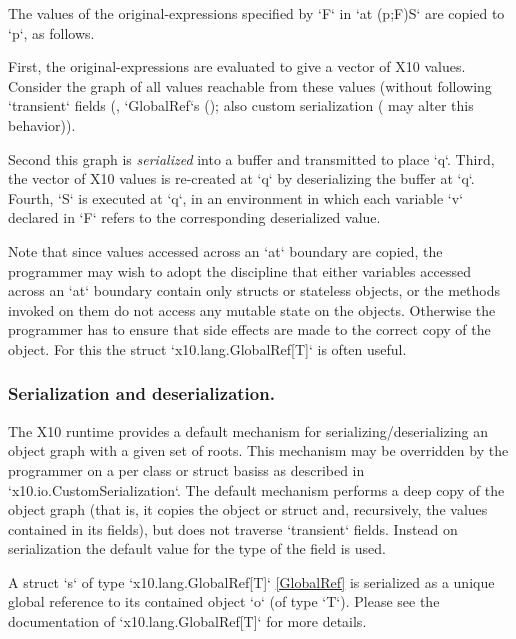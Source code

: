 The values of the original-expressions  specified by \xcd`F` in 
\xcd`at (p;F)S` are copied to \xcd`p`, as follows.

First, the original-expressions are evaluated to give a vector of X10 values.
Consider the graph of all values reachable from these values (without
following 
\xcd`transient` fields 
(, \xcd`GlobalRef`s (); also custom
serialization ( may alter this behavior)). 

Second this graph is {\em
serialized} into a buffer and transmitted to place \xcd`q`.  Third,
the vector of X10 values is 
re-created at \xcd`q` 
by deserializing the buffer at
\xcd`q`. Fourth, \xcd`S` is executed at \xcd`q`, in an environment in
which each variable \xcd`v` declared in \xcd`F` 
refers to the corresponding deserialized value.  

Note that since values accessed across an \xcd`at` boundary are
copied, the programmer may wish to adopt the discipline that either
variables accessed across an \xcd`at` boundary  contain only structs 
or stateless objects, or the methods invoked on them do not access any
mutable state on the objects. Otherwise the programmer has to ensure
that side effects are made to the correct copy of the object. For this
the struct \xcd`x10.lang.GlobalRef[T]` is often useful.


\subsubsection{Serialization and deserialization.}
\label{sect:ser+deser}
The X10 runtime provides a default mechanism for
serializing/deserializing an object graph with a given set of roots.
This mechanism may be overridden by the programmer on a per class or
struct basiss as described in \xcd`x10.io.CustomSerialization`. 
The default mechanism performs a
deep copy of the object graph (that is, it copies the object or struct
and, recursively, the values contained in its fields), but does not
traverse \xcd`transient` fields. Instead on serialization the default
value  for the type of the field is used.

A struct \xcd`s` of type \xcd`x10.lang.GlobalRef[T]` \ref{GlobalRef}
is serialized as a unique global reference to its contained object
\xcd`o` (of type \xcd`T`).  Please see the documentation
of \xcd`x10.lang.GlobalRef[T]` for more details.



